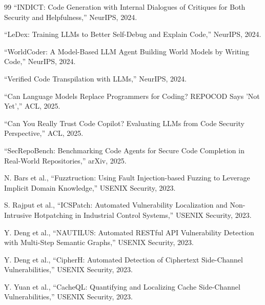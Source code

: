 \documentclass[11pt,a4paper,onecolumn]{article}
\begin{document}
\begin{thebibliography}{99}
``INDICT: Code Generation with Internal Dialogues of Critiques for Both Security and Helpfulness,'' NeurIPS, 2024.

``LeDex: Training LLMs to Better Self-Debug and Explain Code,'' NeurIPS, 2024.

``WorldCoder: A Model-Based LLM Agent Building World Models by Writing Code,'' NeurIPS, 2024.

``Verified Code Transpilation with LLMs,'' NeurIPS, 2024.

``Can Language Models Replace Programmers for Coding? REPOCOD Says 'Not Yet','' ACL, 2025.

``Can You Really Trust Code Copilot? Evaluating LLMs from Code Security Perspective,'' ACL, 2025.

``SecRepoBench: Benchmarking Code Agents for Secure Code Completion in Real-World Repositories,'' arXiv, 2025.

N. Bars et al., ``Fuzztruction: Using Fault Injection-based Fuzzing to Leverage Implicit Domain Knowledge,'' USENIX Security, 2023.

S. Rajput et al., ``ICSPatch: Automated Vulnerability Localization and Non-Intrusive Hotpatching in Industrial Control Systems,'' USENIX Security, 2023.

Y. Deng et al., ``NAUTILUS: Automated RESTful API Vulnerability Detection with Multi-Step Semantic Graphs,'' USENIX Security, 2023.

Y. Deng et al., ``CipherH: Automated Detection of Ciphertext Side-Channel Vulnerabilities,'' USENIX Security, 2023.

Y. Yuan et al., ``CacheQL: Quantifying and Localizing Cache Side-Channel Vulnerabilities,'' USENIX Security, 2023.

\end{thebibliography}
\end{document}
